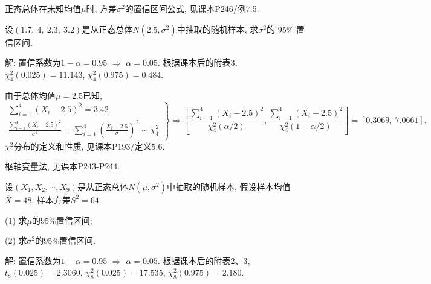 \documentclass[standard]{ExBook}
\renewenvironment{shaded}{%
  \def\FrameCommand{\fboxsep=\FrameSep \colorbox{shadecolor}}%
  \MakeFramed{\advance\hsize-\width \FrameRestore}%
}{%
  \endMakeFramed
}
\begin{document}
\begin{qitems}
\textcolor{themeColor}{\selectfont {}
正态总体在未知均值$\mu$时, 方差$\sigma^2$的置信区间公式, 见课本P246/例7.5.}

\vspace{2.5cm-5em}

    \begin{bbox}
    \begin{shaded}
        \qitem
设$(1.7,\ 4,\ 2.3,\ 3.2)$是从正态总体$N(2.5,\sigma^2)$中抽取的随机样本, 求$\sigma^2$的 95\% 置信区间.
    \end{shaded}
    \end{bbox}

\vspace{\dimexpr2.5cm-5em\relax}

解: 置信系数为$1-\alpha=0.95$ $\Longrightarrow$ $\alpha=0.05$. 根据课本后的附表3,
$\chi_4^2(0.025)=11.143$, $\chi_4^2(0.975)=0.484$.

由于总体均值$\mu=2.5$已知,
$$
\left.
\begin{array}{r}
\sum_{i=1}^{4}(X_i-2.5)^2
=
3.42\\
\frac{\sum\limits_{i=1}^{4}(X_i-2.5)^2}{\sigma^2}
=
\sum_{i=1}^{4}
\left(\frac{X_i-2.5}{\sigma}\right)^2
\sim\chi_4^2
\end{array}
\right\}
\Longrightarrow
\left[
\frac{\sum\limits_{i=1}^{4}(X_i-2.5)^2}
{\chi_4^2(\alpha/2)},
\frac{\sum\limits_{i=1}^{4}(X_i-2.5)^2}
{\chi_4^2(1-\alpha/2)}
\right]
=
[0.3069,\ 7.0661].
$$
\textcolor{themeColor}{\selectfont {} $\chi^2$分布的定义和性质, 见课本P193/定义5.6.}

\textcolor{themeColor}{\selectfont {} 枢轴变量法, 见课本P243-P244.}

\vspace{2.5cm-5em}

    \begin{bbox}
    \begin{shaded}
        \qitem
设$(X_1,X_2,\cdots,X_9)$是从正态总体$N(\mu,\sigma^2)$中抽取的随机样本, 假设样本均值$\overline{X}=48$, 样本方差$S^2=64$.

(1) 求$\mu$的95\%置信区间;

(2) 求$\sigma^2$的95\%置信区间.
    \end{shaded}
    \end{bbox}

\vspace{\dimexpr2.5cm-5em\relax}

解: 置信系数为$1-\alpha=0.95$ $\Longrightarrow$ $\alpha=0.05$. 根据课本后的附表2、3,
$t_8(0.025)=2.3060$,
$\chi_8^2(0.025)=17.535$,
$\chi_8^2(0.975)=2.180$.


\end{qitems}
\end{document}
